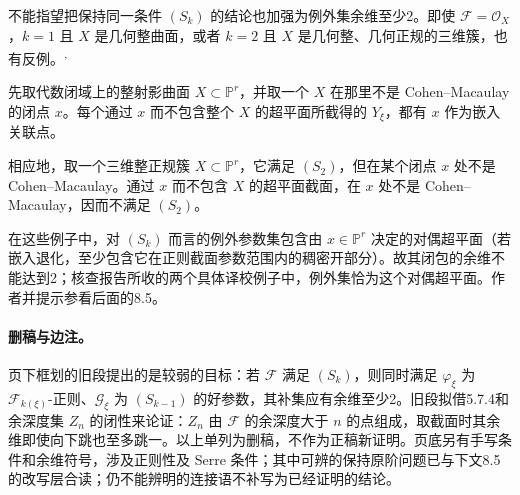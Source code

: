 \begingroup
\def\PP{\mathbb P}\def\OO{\mathcal O}\def\Ocal{\mathcal O}
\def\F{\mathcal F}\def\G{\mathcal G}\def\N{\mathcal N}
\def\PD{\check P}\def\Pdual{\check P}
\def\Ys{Y^{\mathrm{sing}}}\def\Ysing{Y^{\mathrm{sing}}}
\def\Ds{Y^{\mathrm{sup\,sing}}}\def\Ysup{Y^{\mathrm{sup\,sing}}}
\def\cod{\operatorname{codim}}\def\Sing{\operatorname{Sing}}
\def\depth{\operatorname{depth}}\def\coprof{\operatorname{coprof}}
\def\Ass{\operatorname{Ass}}\def\Supp{\operatorname{Supp}}
\def\Gr{\operatorname{Gr}}\def\Spec{\operatorname{Spec}}\def\Proj{\operatorname{Proj}}
不能指望把保持同一条件 $(S_k)$ 的结论也加强为例外集余维至少2。即使 $\mathcal F=\mathcal O_X$，$k=1$ 且 $X$ 是几何整曲面，或者 $k=2$ 且 $X$ 是几何整、几何正规的三维簇，也有反例。\textsuperscript{,}

先取代数闭域上的整射影曲面 $X\subset\mathbb P^r$，并取一个 $X$ 在那里不是 Cohen--Macaulay 的闭点 $x$。每个通过 $x$ 而不包含整个 $X$ 的超平面所截得的 $Y_\xi$，都有 $x$ 作为嵌入关联点。

相应地，取一个三维整正规簇 $X\subset\mathbb P^r$，它满足 $(S_2)$，但在某个闭点 $x$ 处不是 Cohen--Macaulay。通过 $x$ 而不包含 $X$ 的超平面截面，在 $x$ 处不是 Cohen--Macaulay，因而不满足 $(S_2)$。

在这些例子中，对 $(S_k)$ 而言的例外参数集包含由 $x\in\mathbb P^r$ 决定的对偶超平面（若嵌入退化，至少包含它在正则截面参数范围内的稠密开部分）。故其闭包的余维不能达到2；核查报告所收的两个具体译校例子中，例外集恰为这个对偶超平面。作者并提示参看后面的8.5。

\paragraph{删稿与边注。}
页下框划的旧段提出的是较弱的目标：若 $\mathcal F$ 满足 $(S_k)$，则同时满足 $\varphi_\xi$ 为 $\mathcal F_{k(\xi)}$-正则、$\mathcal G_\xi$ 为 $(S_{k-1})$ 的好参数，其补集应有余维至少2。旧段拟借5.7.4和余深度集 $Z_n$ 的闭性来论证：$Z_n$ 由 $\mathcal F$ 的余深度大于 $n$ 的点组成，取截面时其余维即使向下跳也至多跳一。以上单列为删稿，不作为正稿新证明。页底另有手写条件和余维符号，涉及正则性及 Serre 条件；其中可辨的保持原阶问题已与下文8.5的改写层合读；仍不能辨明的连接语不补写为已经证明的结论。
\endgroup
